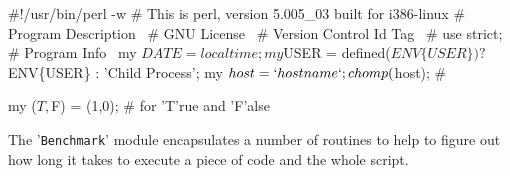 \documentclass[11pt]{article}
\def\nwendcode{\endtrivlist \endgroup} %
\let\nwdocspar=\par                    %
\begin{document}
\begin{comment}
\end{comment}


% 
% 
% 

\newpage %
\appendix



\begin{comment}
\end{comment}

\newpage %



\nwenddocs{}\endmoddef
#!/usr/bin/perl -w
# This is perl, version 5.005_03 built for i386-linux
#
\LA{}Program Description~{\nwtagstyle{}}\RA{}
#
\LA{}GNU License~{\nwtagstyle{}}\RA{}
#
\LA{}Version Control Id Tag~{\nwtagstyle{}}\RA{}
#
use strict;
#
\LA{}Program Info~{\nwtagstyle{}}\RA{}
my $DATE = localtime;
my $USER = defined($ENV\{USER\}) ? $ENV\{USER\} : 'Child Process';
my $host = `hostname`;
chomp($host);
#
\nwendcode{}\nwdocspar

\nwenddocs{}\endmoddef
my ($T,$F) = (1,0); # for 'T'rue and 'F'alse
\eatline
{}\nwendcode{}\nwdocspar


The '{\tt{}Benchmark}' module encapsulates a number of routines to help to figure out how long it takes to execute a piece of code and the whole script.
\end{document}
